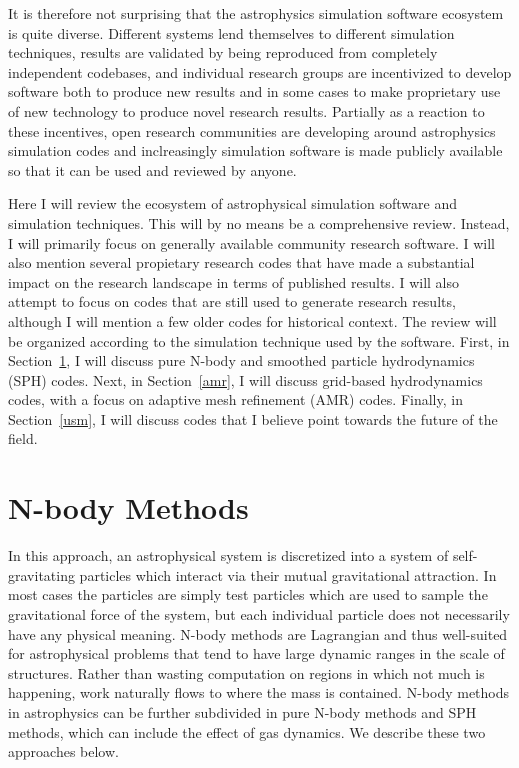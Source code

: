 \documentclass[11pt,twoside]{article}
\begin{document}
It is therefore not surprising that the astrophysics simulation software ecosystem is quite diverse. Different systems lend themselves to different simulation techniques, results are validated by being reproduced from completely independent codebases, and individual research groups are incentivized to develop software both to produce new results and in some cases to make proprietary use of new technology to produce novel research results. Partially as a reaction to these incentives, open research communities are developing around astrophysics simulation codes and inclreasingly simulation software is made publicly available so that it can be used and reviewed by anyone.

Here I will review the ecosystem of astrophysical simulation software and simulation techniques. This will by no means be a comprehensive review. Instead, I will primarily focus on generally available community research software. I will also mention several propietary research codes that have made a substantial impact on the research landscape in terms of published results. I will also attempt to focus on codes that are still used to generate research results, although I will mention a few older codes for historical context. The review will be organized according to the simulation technique used by the software. First, in Section~\ref{nbody}, I will discuss pure N-body and smoothed particle hydrodynamics (SPH) codes. Next, in Section~\ref{amr}, I will discuss grid-based hydrodynamics codes, with a focus on adaptive mesh refinement (AMR) codes. Finally, in Section~\ref{usm}, I will discuss codes that I believe point towards the future of the field.

\section{N-body Methods}
\label{nbody}

In this approach, an astrophysical system is discretized into a system of self-gravitating particles which interact via their mutual gravitational attraction. In most cases the particles are simply test particles which are used to sample the gravitational force of the system, but each individual particle does not necessarily have any physical meaning. N-body methods are Lagrangian and thus well-suited for astrophysical problems that tend to have large dynamic ranges in the scale of structures. Rather than wasting computation on regions in which not much is happening, work naturally flows to where the mass is contained. N-body methods in astrophysics can be further subdivided in pure N-body methods and SPH methods, which can include the effect of gas dynamics. We describe these two approaches below.
\end{document}
